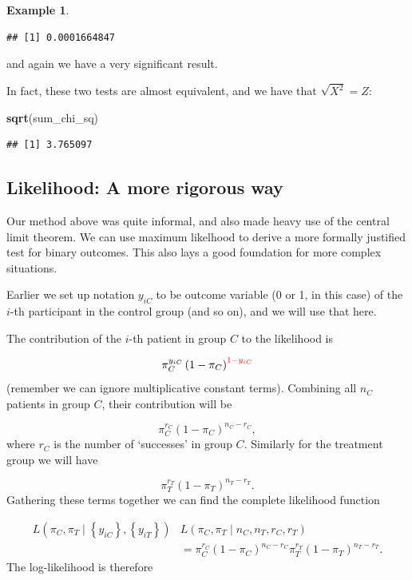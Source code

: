 \documentclass[
  openany]{book}
\newenvironment{Shaded}{\begin{snugshade}}{\end{snugshade}}
\newcommand{\FunctionTok}[1]{\textcolor[rgb]{0.13,0.29,0.53}{\textbf{#1}}}
\newcommand{\NormalTok}[1]{#1}
\theoremstyle{definition}
\theoremstyle{definition}
\newtheorem{example}{Example}[chapter]
\theoremstyle{definition}
\theoremstyle{definition}
\theoremstyle{remark}
\begin{document}
\begin{example}
\begin{verbatim}
## [1] 0.0001664847
\end{verbatim}

and again we have a very significant result.

In fact, these two tests are almost equivalent, and we have that \(\sqrt{X^2} = Z\):

\begin{Shaded}
\begin{Highlighting}[]
\FunctionTok{sqrt}\NormalTok{(sum\_chi\_sq)}
\end{Highlighting}
\end{Shaded}

\begin{verbatim}
## [1] 3.765097
\end{verbatim}

\end{example}

\hypertarget{likelihood-a-more-rigorous-way}{%
\subsection{Likelihood: A more rigorous way}\label{likelihood-a-more-rigorous-way}}

Our method above was quite informal, and also made heavy use of the central limit theorem. We can use maximum likelhood to derive a more formally justified test for binary outcomes. This also lays a good foundation for more complex situations.

Earlier we set up notation \(y_{iC}\) to be outcome variable (0 or 1, in this case) of the \(i\)-th participant in the control group (and so on), and we will use that here.

The contribution of the \(i\)-th patient in group \(C\) to the likelihood is

\[\pi_C^{y_{iC}}\left(1 - \pi_C\right)^{\color{red}{1-}y_{iC}} \]
(remember we can ignore multiplicative constant terms). Combining all \(n_C\) patients in group \(C\), their contribution will be

\[ \pi_C^{r_C}\left(1-\pi_C\right)^{n_C - r_C},\]
where \(r_C\) is the number of `successes' in group \(C\). Similarly for the treatment group we will have

\[ \pi_T^{r_T}\left(1-\pi_T\right)^{n_T - r_T}.\]
Gathering these terms together we can find the complete likelihood function

\[
\begin{aligned}
L\left(\pi_C,\pi_T \mid \left\lbrace y_{iC}\right\rbrace, \left\lbrace y_{iT}\right\rbrace \right) &
  L\left( \pi_C,\pi_T \mid {n_C,n_T, r_C, r_T}\right)\\
  & = \pi_C^{r_C}\left(1-\pi_C\right)^{n_C - r_C}\pi_T^{r_T}\left(1-\pi_T\right)^{n_T - r_T}.
\end{aligned}
\]
The log-likelihood is therefore
\end{document}
